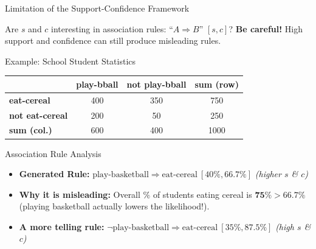 \documentclass[aspectratio=169, 11pt]{beamer}
\begin{document}
\begin{frame}{Limitation of the Support-Confidence Framework}
    \begin{alertblock}{Are $s$ and $c$ interesting in association rules: ``$A \Rightarrow B$'' $[s, c]$?}
        \textbf{Be careful!} High support and confidence can still produce misleading rules.
    \end{alertblock}
    \vspace{0.1cm}
    \begin{exampleblock}{Example: School Student Statistics}
        \centering
        \footnotesize
        \begin{tabular}{@{}lccc@{}}
            \toprule
            & \textbf{play-bball} & \textbf{not play-bball} & \textbf{sum (row)} \\
            \midrule
            \textbf{eat-cereal}     & 400 & 350 & 750 \\
            \textbf{not eat-cereal} & 200 & 50  & 250 \\
            \midrule
            \textbf{sum (col.)}     & 600 & 400 & 1000 \\
            \bottomrule
        \end{tabular}
    \end{exampleblock}
    \begin{block}{Association Rule Analysis}
        \footnotesize
        \begin{itemize}
            \item \textbf{Generated Rule:} $\text{play-basketball} \Rightarrow \text{eat-cereal}\ [40\%, 66.7\%]$ \textit{(higher $s$ \& $c$)}
            \item \textbf{Why it is misleading:} Overall $\%$ of students eating cereal is $\mathbf{75\% > 66.7\%}$ (playing basketball actually lowers the likelihood!).
            \item \textbf{A more telling rule:} $\neg\text{play-basketball} \Rightarrow \text{eat-cereal}\ [35\%, 87.5\%]$ \textit{(high $s$ \& $c$)}
        \end{itemize}
    \end{block}
\end{frame}
\end{document}
